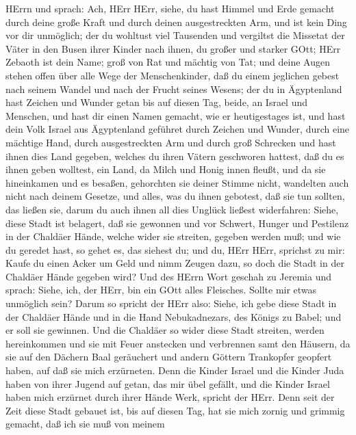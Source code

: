 HErrn und sprach:  Ach, HErr HErr, siehe, du hast Himmel
und Erde gemacht durch deine große Kraft und durch deinen ausgestreckten
Arm, und ist kein Ding vor dir unmöglich;  der du wohltust
viel Tausenden und vergiltst die Missetat der Väter in den Busen ihrer
Kinder nach ihnen, du großer und starker GOtt; HErr Zebaoth ist dein
Name;  groß von Rat und mächtig von Tat; und deine Augen
stehen offen über alle Wege der Menschenkinder, daß du einem jeglichen
gebest nach seinem Wandel und nach der Frucht seines Wesens;
 der du in Ägyptenland hast Zeichen und Wunder getan bis
auf diesen Tag, beide, an Israel und Menschen, und hast dir einen Namen
gemacht, wie er heutigestages ist,  und hast dein Volk
Israel aus Ägyptenland geführet durch Zeichen und Wunder, durch eine
mächtige Hand, durch ausgestreckten Arm und durch groß Schrecken
 und hast ihnen dies Land gegeben, welches du ihren Vätern
geschworen hattest, daß du es ihnen geben wolltest, ein Land, da Milch
und Honig innen fleußt,  und da sie hineinkamen und es
besaßen, gehorchten sie deiner Stimme nicht, wandelten auch nicht nach
deinem Gesetze, und alles, was du ihnen gebotest, daß sie tun sollten,
das ließen sie, darum du auch ihnen all dies Unglück ließest
widerfahren:  Siehe, diese Stadt ist belagert, daß sie
gewonnen und vor Schwert, Hunger und Pestilenz in der Chaldäer Hände,
welche wider sie streiten, gegeben werden muß; und wie du geredet hast,
so gehet es, das siehest du;  und du, HErr HErr, sprichst
zu mir: Kaufe du einen Acker um Geld und nimm Zeugen dazu, so doch die
Stadt in der Chaldäer Hände gegeben wird?  Und des HErrn
Wort geschah zu Jeremia und sprach:  Siehe, ich, der HErr,
bin ein GOtt alles Fleisches. Sollte mir etwas unmöglich sein?
 Darum so spricht der HErr also: Siehe, ich gebe diese
Stadt in der Chaldäer Hände und in die Hand Nebukadnezars, des Königs zu
Babel; und er soll sie gewinnen.  Und die Chaldäer so wider
diese Stadt streiten, werden hereinkommen und sie mit Feuer anstecken
und verbrennen samt den Häusern, da sie auf den Dächern Baal geräuchert
und andern Göttern Trankopfer geopfert haben, auf daß sie mich
erzürneten.  Denn die Kinder Israel und die Kinder Juda
haben von ihrer Jugend auf getan, das mir übel gefällt, und die Kinder
Israel haben mich erzürnet durch ihrer Hände Werk, spricht der HErr.
 Denn seit der Zeit diese Stadt gebauet ist, bis auf diesen
Tag, hat sie mich zornig und grimmig gemacht, daß ich sie muß von meinem
